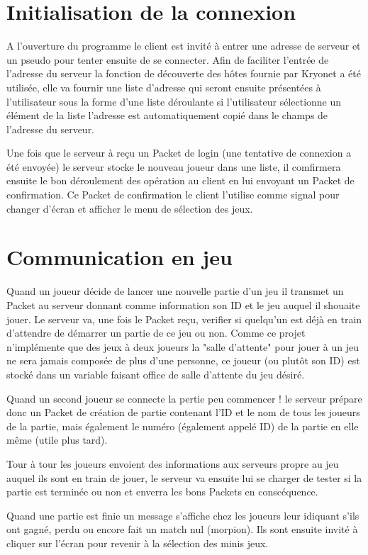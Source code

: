 \documentclass{report}
\begin{document}
\section{Initialisation de la connexion}
A l'ouverture du programme le client est invité à entrer une adresse de serveur
et un pseudo pour tenter ensuite de se connecter. Afin de faciliter l'entrée de l'adresse du serveur la fonction de
découverte des hôtes fournie par Kryonet a été utilisée, elle va fournir une
liste d'adresse qui seront ensuite présentées à l'utilisateur sous la forme d'une liste déroulante
si l'utilisateur sélectionne un élément de la liste l'adresse est automatiquement copié dans le champs de l'adresse du serveur.

Une fois que le serveur à reçu un Packet de login (une tentative de connexion a
été envoyée) le serveur stocke le nouveau joueur dans une liste, il comfirmera ensuite le
bon déroulement des opération au client en lui envoyant un Packet de confirmation.
Ce Packet de confirmation le client l'utilise comme signal pour changer d'écran
et afficher le menu de sélection des jeux.

\section{Communication en jeu}

Quand un joueur décide de lancer une nouvelle partie d'un jeu il transmet un Packet au serveur donnant comme information son ID et le jeu
auquel il shouaite jouer. Le serveur va, une fois le Packet reçu, verifier si quelqu'un est déjà en train d'attendre de démarrer un partie de ce jeu
ou non. Comme ce projet n'implémente que des jeux à deux joueurs la "salle d'attente" pour jouer à un jeu ne sera jamais composée de plus d'une personne,
ce joueur (ou plutôt son ID) est stocké dans un variable faisant office de salle d'attente du jeu désiré.

Quand un second joueur se connecte la pertie peu commencer ! le serveur prépare donc un Packet de création de partie contenant l'ID et le nom de tous les
joueurs de la partie, mais également le numéro (également appelé ID) de la partie en elle même (utile plus tard).

Tour à tour les joueurs envoient des informations aux serveurs propre au jeu auquel ils sont en train de jouer, le serveur va ensuite lui se charger de
tester si la partie est terminée ou non et enverra les bons Packets en conscéquence.

Quand une partie est finie un message s'affiche chez les joueurs leur idiquant s'ils ont gagné, perdu ou encore fait un match nul (morpion). Ils sont
ensuite invité à cliquer sur l'écran pour revenir à la sélection des minis jeux.
\end{document}
